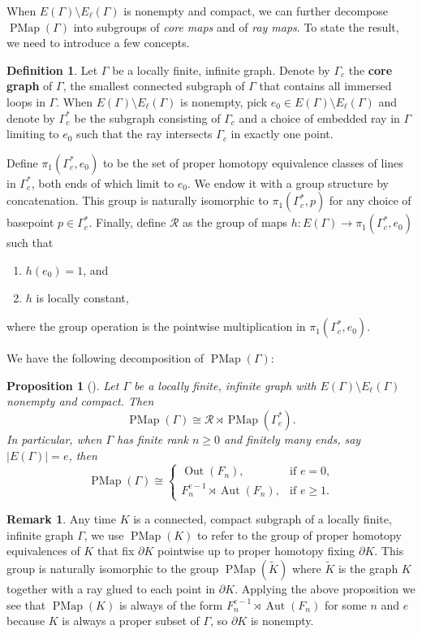 \documentclass[11pt]{amsart}
\theoremstyle{plain}
\newtheorem{PROP}[THM]{Proposition}
\theoremstyle{definition}
\newtheorem{DEF}[THM]{Definition}
\newtheorem{RMK}[THM]{Remark}
\DeclareMathOperator{\Aut}{Aut}
\DeclareMathOperator{\Out}{Out}
\DeclareMathOperator{\PMap}{PMap}
\newcommand{\cR}{\mathcal{R}}
\def\G{{\Gamma}}
\newcommand{\<}{\langle}
\renewcommand{\>}{\rangle}
\begin{document}
 When $E(\G) \setminus E_\ell(\G)$ is nonempty and compact, we can further decompose $\PMap(\G)$ into subgroups of  \emph{core maps} and of \emph{ray maps}. To state the result, we need to introduce a few concepts. 
 \begin{DEF} 
     Let $\G$ be a locally finite, infinite graph. Denote by $\G_c$ the \textbf{core graph} of $\G$, the smallest connected subgraph of $\G$ that contains all immersed loops in $\G$. When $E(\G) \setminus E_\ell(\G)$ is nonempty, pick $e_0 \in E(\G) \setminus E_\ell(\G)$ and denote by $\G_c^*$ be the subgraph consisting of $\G_c$ and a choice of embedded ray in $\G$ limiting to $e_0$ such that the ray intersects $\G_c$ in exactly one point.

     Define $\pi_1(\G_c^*,e_0)$ to be the set of proper homotopy equivalence classes of lines in $\G_c^*$, both ends of which limit to $e_0$. We endow it with a group structure by concatenation. This group is naturally isomorphic to $\pi_{1}(\G_{c}^{*},p)$ for any choice of basepoint $p \in \G_{c}^{*}$. Finally, define $\cR$ as the group of maps $h: E(\G) \to \pi_1(\G_c^*,e_0)$ such that
     \begin{enumerate}[label=(\roman*)]
         \item $h(e_0) =1$, and
         \item $h$ is locally constant,
     \end{enumerate}
     where the group operation is the pointwise multiplication in $\pi_1(\G_c^*,e_0)$.
 \end{DEF}

 We have the following decomposition of $\PMap(\G)$:

\begin{PROP}[{\cite[Corollary 3.9]{AB2021}}]
\label{prop:RsubgroupDecomposition}
    Let $\G$ be a locally finite, infinite graph with $E(\G) \setminus E_\ell(\G)$ nonempty and compact. Then
    \[
        \PMap(\G) \cong \cR \rtimes \PMap(\G_c^*).
    \]
    In particular, when $\G$ has finite rank $n \ge 0$ and finitely many ends, say $|E(\G)|=e$, then
    \[
        \PMap(\G) \cong
        \begin{cases}
            \Out(F_n), & \text{if $e=0$,} \\
            F_n^{e-1} \rtimes \Aut(F_n), & \text{if $e \ge 1$.}
        \end{cases}
    \]
\end{PROP}


\begin{RMK}\label{rmk:compactMCG}
    Any time $K$ is a connected, compact subgraph of a locally finite, infinite graph $\G$, we use $\PMap(K)$ to refer to the group of proper homotopy equivalences of $K$ that fix $\partial K$ pointwise up to proper homotopy fixing $\partial K$. This group is naturally isomorphic to the group $\PMap(\tilde{K})$ where $\tilde{K}$ is the graph $K$ together with a ray glued to each point in $\partial K$. Applying the above proposition we see that $\PMap(K)$ is always of the form $F_{n}^{e-1} \rtimes \Aut(F_{n})$ for some $n$ and $e$ because $K$ is always a proper subset of $\G$, so $\partial K$ is nonempty.
\end{RMK}
\end{document}
